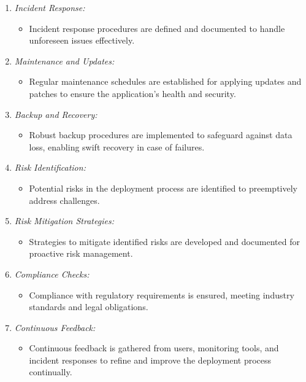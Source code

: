 \documentclass[12pt, letterpaper]{article}
\begin{document}
\begin{enumerate}
    \item \textit{Incident Response:}
    \begin{itemize}
        \item Incident response procedures are defined and documented to handle unforeseen issues effectively.
    \end{itemize}
    \vspace{1cm}
    \item \textit{Maintenance and Updates:}
    \begin{itemize}
        \item Regular maintenance schedules are established for applying updates and patches to ensure the application's health and security.
    \end{itemize}
    \vspace{1cm}
    \item \textit{Backup and Recovery:}
    \begin{itemize}
        \item Robust backup procedures are implemented to safeguard against data loss, enabling swift recovery in case of failures.
    \end{itemize}
    
    \item \textit{Risk Identification:}
    \begin{itemize}
        \item Potential risks in the deployment process are identified to preemptively address challenges.
    \end{itemize}
    
    \item \textit{Risk Mitigation Strategies:}
    \begin{itemize}
        \item Strategies to mitigate identified risks are developed and documented for proactive risk management.
    \end{itemize}
    
    \item \textit{Compliance Checks:}
    \begin{itemize}
        \item Compliance with regulatory requirements is ensured, meeting industry standards and legal obligations.
    \end{itemize}
    
    \item \textit{Continuous Feedback:}
    \begin{itemize}
        \item Continuous feedback is gathered from users, monitoring tools, and incident responses to refine and improve the deployment process continually.
    \end{itemize}
    

\end{enumerate}
\end{document}
